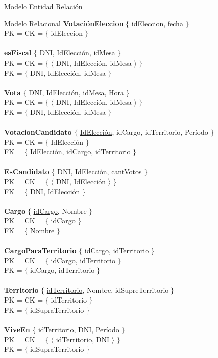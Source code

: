 \begin{section}{Modelo Entidad Relaci\'on}
\begin{subsection}{Modelo Relacional}
\textbf{Votaci\'onEleccion} $ \lbrace $ \underline{idEleccion}, fecha $ \rbrace $ \\
PK = CK = $ \lbrace $ idEleccion $ \rbrace $ \\
\\
\textbf{esFiscal} $ \lbrace $ \underline{DNI, IdElecci\'on, idMesa} $ \rbrace $ \\
PK = CK = $ \lbrace $ $ \langle $ DNI, IdElecci\'on, idMesa $ \rangle $ $ \rbrace $ \\
FK = $ \lbrace $ DNI, IdElecci\'on, idMesa $ \rbrace $\\
\\
\textbf{Vota} $ \lbrace $ \underline{DNI, IdElecci\'on, idMesa}, Hora $ \rbrace $ \\
PK = CK = $ \lbrace $ $ \langle $ DNI, IdElecci\'on, idMesa $ \rangle $ $ \rbrace $ \\
FK = $ \lbrace $ DNI, IdElecci\'on, idMesa $ \rbrace $\\
\\
\textbf{VotacionCandidato} $ \lbrace $ \underline{IdElecci\'on}, idCargo, idTerritorio, Per\'iodo $ \rbrace $ \\
PK = CK = $ \lbrace $ IdElecci\'on $ \rbrace $ \\
FK = $ \lbrace $ IdElecci\'on, idCargo, idTerritorio $ \rbrace $\\
\\
\textbf{EsCandidato} $ \lbrace $ \underline{DNI, IdElecci\'on}, cantVotos $ \rbrace $ \\
PK = CK = $ \lbrace $ $ \langle $ DNI, IdElecci\'on $ \rangle $ $ \rbrace $ \\
FK = $ \lbrace $ DNI, IdElecci\'on $ \rbrace $\\
\\
\textbf{Cargo} $ \lbrace $ \underline{idCargo}, Nombre $ \rbrace $ \\
PK = CK = $ \lbrace $ idCargo $ \rbrace $ \\
FK = $ \lbrace $ Nombre $ \rbrace $\\
\\
\textbf{CargoParaTerritorio} $ \lbrace $ \underline{idCargo, idTerritorio} $ \rbrace $ \\
PK = CK = $ \lbrace $ idCargo, idTerritorio $ \rbrace $ \\
FK = $ \lbrace $ idCargo, idTerritorio $ \rbrace $\\
\\
\textbf{Territorio} $ \lbrace $ \underline{idTerritorio}, Nombre, idSupreTerritorio $ \rbrace $ \\
PK = CK = $ \lbrace $ idTerritorio $ \rbrace $ \\
FK = $ \lbrace $ idSupraTerritorio $ \rbrace $\\
\\
\textbf{ViveEn} $ \lbrace $ \underline{idTerritorio, DNI}, Per\'iodo $ \rbrace $ \\
PK = CK = $ \lbrace $ $ \langle $ idTerritorio, DNI $ \rangle $ $ \rbrace $ \\
FK = $ \lbrace $ idSupraTerritorio $ \rbrace $\\


\end{subsection}
\end{section}
